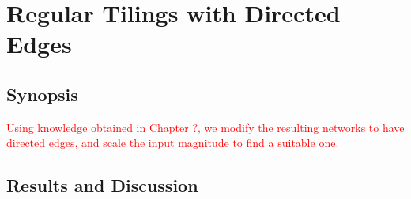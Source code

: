 \section{Regular Tilings with Directed Edges}

\subsection{Synopsis}

\textcolor{red}{
Using knowledge obtained in Chapter ?, we modify the resulting networks to have
directed edges, and scale the input magnitude to find a suitable one.
}

\subsection{Results and Discussion}

